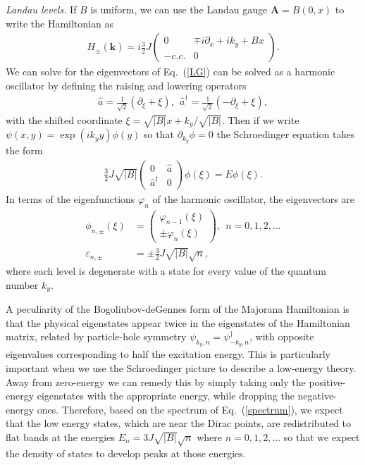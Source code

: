 \documentclass[reprint,amsmath,amssymb,aps,prl,groupedaddress,nofootinbib,superscriptaddress]{revtex4-1}
\newcommand{\1}{\mathds{1}}
\begin{document}
{\it Landau levels.} If $B$ is uniform, we can use the Landau gauge $\mathbf{A} = B(0,x)$ to write the Hamiltonian as
\begin{align}\label{LG}
H_{\pm}(\mathbf{k}) = i \frac{3}{2} J
\left(\begin{array}{cc}
0 & \mp i\partial_x + ik_y + B x \\
-c.c. & 0
\end{array}\right).
\end{align}
We can solve for the eigenvectors of Eq.~(\ref{LG}) can be solved as a harmonic oscillator by defining the raising and lowering operators
\begin{align}
\hat{a} = \frac{1}{\sqrt{2}} (\partial_\xi + \xi), \ \ \hat{a}^\dagger = \frac{1}{\sqrt{2}} (-\partial_\xi + \xi),
\end{align}
with the shifted coordinate $\xi = \sqrt{|B|} x + k_y/\sqrt{|B|}$. Then if we write $\psi(x,y) = \exp(ik_y y) \phi(y)$ so that $\partial_{k_y} \phi = 0$ the Schroedinger equation takes the form
\begin{align}
\frac{3}{2} J \sqrt{|B|}
\left(\begin{array}{cc}
0 & \hat{a} \\
\hat{a}^\dagger & 0
\end{array}\right) \phi(\xi) = E \phi(\xi).
\end{align}   
In terms of the eigenfunctions $\varphi_n$ of the harmonic oscillator, the eigenvectors are \cite{Neto09,McClure56}
\begin{align}
\phi_{n,\pm}(\xi) &= 
\left(\begin{array}{c}
\varphi_{n-1}(\xi)  \\
\pm \varphi_n(\xi)
\end{array}\right) ,\ \ n = 0,1,2,... \\
\varepsilon_{n,\pm}& = \pm \frac{3}{2} J \sqrt{|B|} \sqrt{n}, \label{spectrum}
\end{align} 
where each level is degenerate with a state for every value of the quantum number $k_y$. 

A peculiarity of the Bogoliubov-deGennes form of the Majorana Hamiltonian is that the physical eigenstates appear twice in the eigenstates of the Hamiltonian matrix,\cite{Blaizot86} related by particle-hole symmetry $\psi_{k_y,n} = \psi^\dagger_{-k_y,n}$, with opposite eigenvalues corresponding to half the excitation energy. This is particularly important when we use the Schroedinger picture to describe a low-energy theory. Away from zero-energy we can remedy this by simply taking only the positive-energy eigenstates with the appropriate energy, while dropping the negative-energy ones. Therefore, based on the spectrum of Eq.~(\ref{spectrum}), we expect that the low energy states, which are near the Dirac points, are redistributed to flat bands at the energies $E_{n} = 3 J \sqrt{|B|} \sqrt{n}$ where $n = 0,1,2,...$ so that we expect the density of states to develop peaks at those energies.
\end{document}
